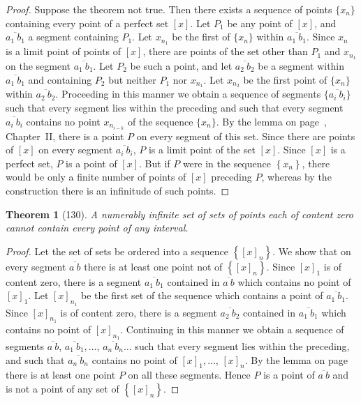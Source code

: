 \documentclass[a4paper,12pt]{book}[2004/02/16]
\providecommand{\hyperlink}[2]{#2}
\providecommand{\hypertarget}[2]{#2}
\theoremstyle{ilemma}
\theoremstyle{itheorem}
\newtheorem{theorem}{Theorem}
\theoremstyle{iother}
\theoremstyle{icorollary}
\theoremstyle{numcorollary}
\theoremstyle{idefinition}
\begin{document}
\begin{proof}
Suppose the theorem not true. Then there exists a sequence of points
$\{x_n\}$ containing every point of a perfect set $[x]$. Let $P_1$ be
any point of $[x]$, and $\overline{a_1\ b_1}$ a segment containing
$P_1$. Let $x_{n_1}$ be the first of $\{x_n\}$ within $\overline{a_1\
b_1}$. Since $x_n$ is a limit point of points of $[x]$, there are
points of the set other than $P_1$ and $x_{n_1}$ on the segment
$\overline{a_1\ b_1}$. Let $P_2$ be such a point, and let
$\overline{a_2\ b_2}$ be a segment within $\overline{a_1\ b_1}$ and
containing $P_2$ but neither $P_1$ nor $x_{n_1}$. Let $x_{n_2}$ be the
first point of $\{x_n\}$ within $\overline{a_2\ b_2}$. Proceeding in
this manner we obtain a sequence of segments $\{\overline{a_i\ b_i}\}$
such that every segment lies within the preceding and such that every
segment $\overline{a_i\ b_i}$ contains no point $x_{n_{i-k}}$ of the
sequence $\{x_n\}$. By the lemma on page~\pageref{lp42}, Chapter~\hyperlink{chapII}{II}, there is a
point $P$ on every segment of this set. Since there are points of
$[x]$ on every segment $\overline{a_i\ b_i}$, $P$ is a limit point of
the set $[x]$. Since $[x]$ is a perfect set, $P$ is a point of
$[x]$. But if $P$
were in the sequence $\left\{x_n\right\}$, there would be only a
finite number of points of $[x]$ preceding $P$, whereas by the
construction there is an infinitude of such points.
\end{proof}

\begin{theorem}[130]\hypertarget{thm130}{}
A numerably infinite set of sets of points each of content zero cannot
contain every point of any interval.
\end{theorem}

\begin{proof}
Let the set of sets be ordered into a sequence $\left\{[x]_n\right\}$.
We show that on every segment $\overline{a\ b}$ there is at least one
point not of $\left\{[x]_n\right\}$. Since $[x]_1$ is of content zero,
there is a segment $\overline{a_1\ b_1}$ contained in $\overline{a\
b}$ which contains no point of $[x]_1$. Let $[x]_{{n}_1}$ be the first
set of the sequence which contains a point of $\overline{a_1\
b_1}$. Since $[x]_{{n}_1}$ is of content zero, there is a segment
$\overline{a_2\ b_2}$ contained in $\overline{a_1\ b_1}$ which
contains no point of $[x]_{{n}_1}$. Continuing in this manner we
obtain a sequence of segments $\overline{a\ b}$, $\overline{a_1\
b_1},\ldots$, $\overline{a_n\ b_n} \ldots$ such that every segment
lies within the preceding,
and such that $\overline{a_n\ b_n}$ contains no point of
$[x]_1,\ldots$, $[x]_n$. By the lemma on page~\pageref{lp42} there is at least one
point $P$ on all these segments. Hence $P$ is a point of $\overline{a\
b}$ and is not a point of any set of $\left\{[x]_n\right\}$.
\end{proof}
\end{document}
